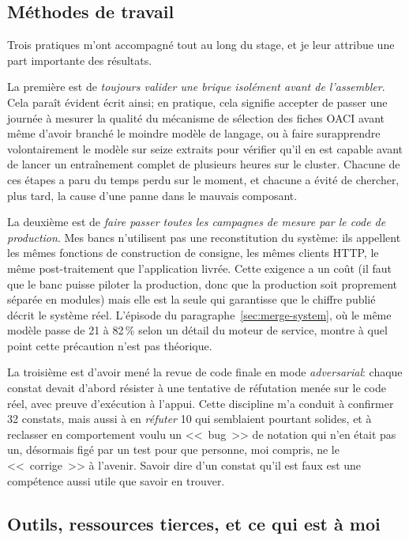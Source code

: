 \documentclass[11pt,a4paper]{article}
\begin{document}
\subsection{Méthodes de travail}

Trois pratiques m'ont accompagné tout au long du stage, et je leur attribue une part importante des résultats.

La première est de \emph{toujours valider une brique isolément avant de l'assembler}. Cela paraît évident écrit ainsi; en pratique, cela signifie accepter de passer une journée à mesurer la qualité du mécanisme de sélection des fiches OACI avant même d'avoir branché le moindre modèle de langage, ou à faire surapprendre volontairement le modèle sur seize extraits pour vérifier qu'il en est capable avant de lancer un entraînement complet de plusieurs heures sur le cluster. Chacune de ces étapes a paru du temps perdu sur le moment, et chacune a évité de chercher, plus tard, la cause d'une panne dans le mauvais composant.

La deuxième est de \emph{faire passer toutes les campagnes de mesure par le code de production}. Mes bancs n'utilisent pas une reconstitution du système: ils appellent les mêmes fonctions de construction de consigne, les mêmes clients HTTP, le même post-traitement que l'application livrée. Cette exigence a un coût (il faut que le banc puisse piloter la production, donc que la production soit proprement séparée en modules) mais elle est la seule qui garantisse que le chiffre publié décrit le système réel. L'épisode du paragraphe~\ref{sec:merge-system}, où le même modèle passe de 21 à 82\,\% selon un détail du moteur de service, montre à quel point cette précaution n'est pas théorique. 

La troisième est d'avoir mené la revue de code finale en mode \emph{adversarial}: chaque constat devait d'abord résister à une tentative de réfutation menée sur le code réel, avec preuve d'exécution à l'appui. Cette discipline m'a conduit à confirmer 32 constats, mais aussi à en \emph{réfuter} 10 qui semblaient pourtant solides, et à reclasser en comportement voulu un <<~bug~>> de notation qui n'en était pas un, désormais figé par un test pour que personne, moi compris, ne le <<~corrige~>> à l'avenir. Savoir dire d'un constat qu'il est faux est une compétence aussi utile que savoir en trouver.

\subsection{Outils, ressources tierces, et ce qui est à moi}
\label{sec:outils}
\end{document}
